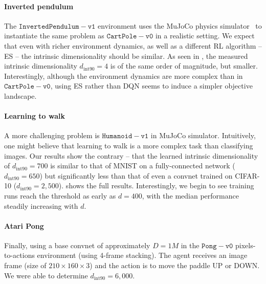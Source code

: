 \documentclass{article} %
\newcommand{\dintn}{d_{\mathrm{int90}}}
\begin{document}
\paragraph{Inverted pendulum}

The $\mathtt{InvertedPendulum\!-\!v1}$ environment uses the MuJoCo physics simulator~\citep{todorov2012mujoco} to instantiate the same problem as $\mathtt{CartPole\!-\!v0}$ in a realistic setting. We expect that even with richer environment dynamics, as well as a different RL algorithm -- ES -- the intrinsic dimensionality should be similar. As seen in , the measured intrinsic dimensionality $\dintn = 4$ is of the same order of magnitude, but smaller. Interestingly, although the environment dynamics are more complex than in $\mathtt{CartPole\!-\!v0}$, using ES rather than DQN seems to induce a simpler objective landscape.


\paragraph{Learning to walk}

A more challenging problem is $\mathtt{Humanoid\!-\!v1}$ in MuJoCo simulator. Intuitively, one might believe that learning to walk is a more complex task than classifying images. Our results show the contrary -- that the learned intrinsic dimensionality of $\dintn = 700$ is similar to that of MNIST on a fully-connected network ($\dintn = 650$) but significantly less than that of even a convnet trained on CIFAR-10 ($\dintn = 2,500$).  shows the full results. Interestingly, we begin to see training runs reach the threshold as early as $d = 400$, with the median performance steadily increasing with $d$.


\paragraph{Atari Pong}

Finally, using a base convnet of approximately $D = 1M$ in the $\mathtt{Pong\!-\!v0}$  pixels-to-actions environment (using 4-frame stacking). The agent receives an image frame (size of  $210\times160\times3$) and the action is to move the paddle UP or DOWN. We were able to determine $\dintn = 6,000$.
\end{document}
